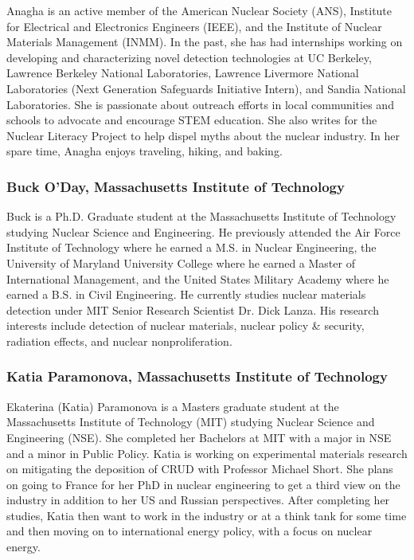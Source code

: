 Anagha is an active member of the American Nuclear Society (ANS), Institute for
Electrical and Electronics Engineers (IEEE), and the Institute of Nuclear
Materials Management (INMM). In the past, she has had internships working on
developing and characterizing novel detection technologies at UC Berkeley,
Lawrence Berkeley National Laboratories, Lawrence Livermore National
Laboratories (Next Generation Safeguards Initiative Intern), and Sandia National
Laboratories. She is passionate about outreach efforts in local communities and
schools to advocate and encourage STEM education. She also writes for the
Nuclear Literacy Project to help dispel myths about the nuclear industry. In her
spare time, Anagha enjoys traveling, hiking, and baking.

\subsubsection*{Buck O'Day, Massachusetts Institute of Technology}

Buck is a Ph.D. Graduate student at the Massachusetts Institute of Technology
studying Nuclear Science and Engineering. He previously attended the Air Force
Institute of Technology where he earned a M.S. in Nuclear Engineering, the
University of Maryland University College where he earned a Master of
International Management, and the United States Military Academy where he earned
a B.S. in Civil Engineering. He currently studies nuclear materials detection
under MIT Senior Research Scientist Dr. Dick Lanza. His research interests
include detection of nuclear materials, nuclear policy \& security, radiation
effects, and nuclear nonproliferation.

\subsubsection*{Katia Paramonova, Massachusetts Institute of Technology}

Ekaterina (Katia) Paramonova is a Masters graduate student at the Massachusetts
Institute of Technology (MIT) studying Nuclear Science and Engineering
(NSE). She completed her Bachelors at MIT with a major in NSE and a minor in
Public Policy. Katia is working on experimental materials research on mitigating
the deposition of CRUD with Professor Michael Short. She plans on going to
France for her PhD in nuclear engineering to get a third view on the industry in
addition to her US and Russian perspectives. After completing her studies, Katia
then want to work in the industry or at a think tank for some time and then
moving on to international energy policy, with a focus on nuclear energy.

